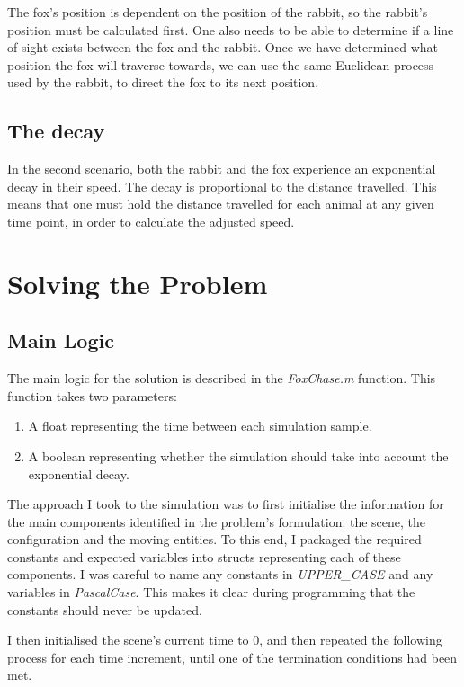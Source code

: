 \documentclass[11pt]{article}
\begin{document}
The fox's position is dependent on the position of the rabbit, so the rabbit's position must be calculated first. One also needs to be able to determine if a line of sight exists between the fox and the rabbit. Once we have determined what position the fox will traverse towards, we can use the same Euclidean process used by the rabbit, to direct the fox to its next position.

\subsection{The decay}
In the second scenario, both the rabbit and the fox experience an exponential decay in their speed. The decay is proportional to the distance travelled. This means that one must hold the distance travelled for each animal at any given time point, in order to calculate the adjusted speed.

\section{Solving the Problem}

\subsection{Main Logic}

The main logic for the solution is described in the \textit{FoxChase.m} function. This function takes two parameters:

\begin{enumerate}
	\item A float representing the time between each simulation sample.
	\item A boolean representing whether the simulation should take into account the exponential decay.
\end{enumerate}

The approach I took to the simulation was to first initialise the information for the main components identified in the problem's formulation: the scene, the configuration and the moving entities. To this end, I packaged the required constants and expected variables into structs representing each of these components. I was careful to name any constants in \textit{UPPER\_CASE} and any variables in \textit{PascalCase}. This makes it clear during programming that the constants should never be updated.

I then initialised the scene's current time to 0, and then repeated the following process for each time increment, until one of the termination conditions had been met.
\end{document}
